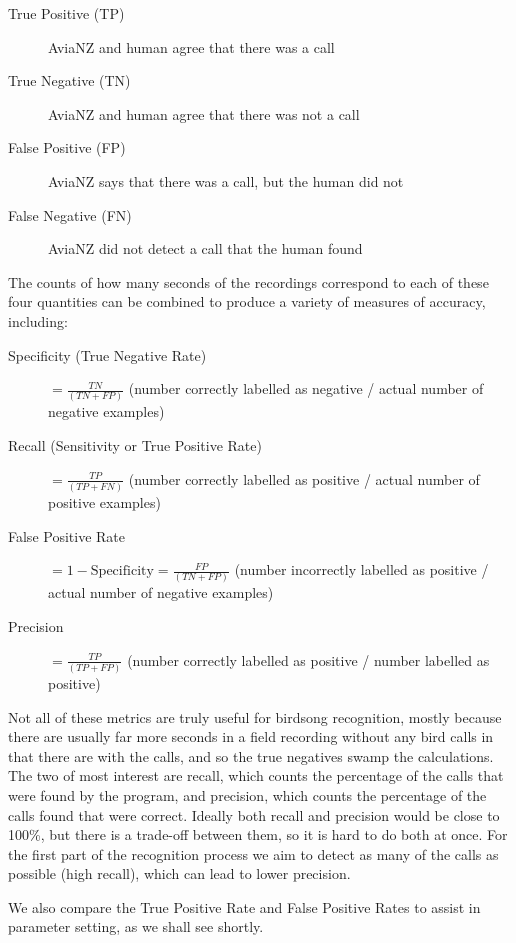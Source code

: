 \documentclass{article}
\begin{document}
\begin{description}
\item[True Positive (TP)] AviaNZ and human agree that there was a call 
\item[True Negative (TN)] AviaNZ and human agree that there was not a call
\item[False Positive (FP)] AviaNZ says that there was a call, but the human did not
\item[False Negative (FN)] AviaNZ did not detect a call that the human found
\end{description}

The counts of how many seconds of the recordings correspond to each of these four quantities can be combined to produce a variety of measures of accuracy, including:

\begin{description}
\item[Specificity (True Negative Rate)] $= \frac{TN}{(TN + FP)}$ (number correctly labelled as negative / actual number of negative examples)
\item[Recall (Sensitivity or True Positive Rate)] $= \frac{TP}{(TP + FN)}$ (number correctly labelled as positive / actual number of positive examples) 
\item[False Positive Rate] $= 1 - \mathrm{Specificity} = \frac{FP}{(TN + FP)}$ (number incorrectly labelled as positive / actual number of negative examples)
\item[Precision] $= \frac{TP}{(TP + FP)}$ (number correctly labelled as positive / number labelled as positive)
\end{description}

Not all of these metrics are truly useful for birdsong recognition, mostly because there are usually far more seconds in a field recording without any bird calls in that there are with the calls, and so the true negatives swamp the calculations. The two of most interest are recall, which counts the percentage of the calls that were found by the program, and precision, which counts the percentage of the calls found that were correct. Ideally both recall and precision would be close to 100\%, but there is a trade-off between them, so it is hard to do both at once. For the first part of the recognition process we aim to detect as many of the calls as possible (high recall), which can lead to lower precision. 

We also compare the True Positive Rate and False Positive Rates to assist in parameter setting, as we shall see shortly.
\end{document}
